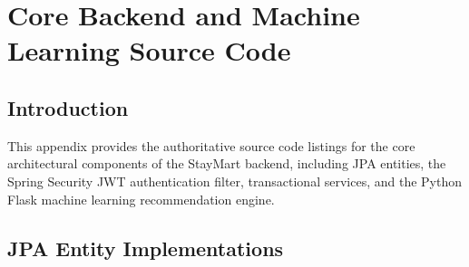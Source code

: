 \chapter{Core Backend and Machine Learning Source Code}

\section{Introduction}
This appendix provides the authoritative source code listings for the core architectural components of the StayMart backend, including JPA entities, the Spring Security JWT authentication filter, transactional services, and the Python Flask machine learning recommendation engine.

\section{JPA Entity Implementations}

